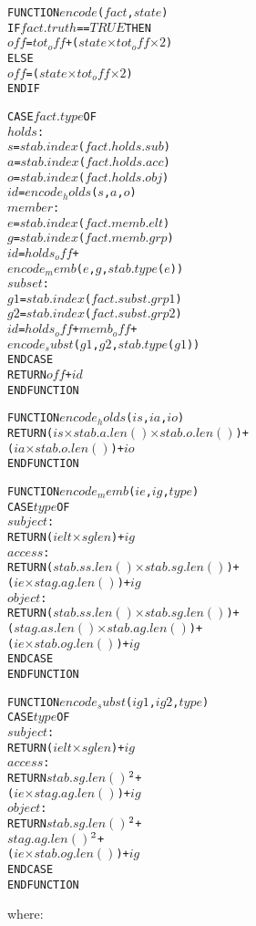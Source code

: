 \documentclass[10pt, twocolumn]{article}
\begin{document}
          \begin{alltt}
FUNCTION \(encode\)(\(fact\), \(state\))
  IF \(fact.truth\) == \(TRUE\) THEN
    \(off\) = \(tot_off\) + (\(state\) \(\times\) \(tot_off\) \(\times\) \(2\))
  ELSE
    \(off\) = (\(state\) \(\times\) \(tot_off\) \(\times\) \(2\))
  ENDIF

  CASE \(fact.type\) OF
    \(holds\) :
      \(s\) = \(stab.index\)(\(fact.holds.sub\))
      \(a\) = \(stab.index\)(\(fact.holds.acc\))
      \(o\) = \(stab.index\)(\(fact.holds.obj\))
      \(id\) = \(encode_holds\)(\(s\), \(a\), \(o\))
    \(member\) :
      \(e\) = \(stab.index\)(\(fact.memb.elt\))
      \(g\) = \(stab.index\)(\(fact.memb.grp\))
      \(id\) = \(holds_off\) +
          \(encode_memb\)(\(e\), \(g\), \(stab.type\)(\(e\)))
    \(subset\) :
      \(g1\) = \(stab.index\)(\(fact.subst.grp1\))
      \(g2\) = \(stab.index\)(\(fact.subst.grp2\))
      \(id\) = \(holds_off\) + \(memb_off\) +
          \(encode_subst\)(\(g1\), \(g2\), \(stab.type\)(\(g1\)))
  ENDCASE
  RETURN \(off\) + \(id\)
ENDFUNCTION

FUNCTION \(encode_holds\)(\(is\), \(ia\), \(io\))
  RETURN (\(is\) \(\times\) \(stab.a.len()\) \(\times\) \(stab.o.len()\)) +
         (\(ia\) \(\times\) \(stab.o.len()\)) + \(io\)
ENDFUNCTION

FUNCTION \(encode_memb\)(\(ie\), \(ig\), \(type\))
  CASE \(type\) OF
    \(subject\) :
      RETURN (\(ielt\) \(\times\) \(sglen\)) + \(ig\)
    \(access\) : 
      RETURN (\(stab.ss.len()\) \(\times\) \(stab.sg.len()\)) +
             (\(ie\) \(\times\) \(stag.ag.len()\)) + \(ig\)
    \(object\) :
      RETURN (\(stab.ss.len()\) \(\times\) \(stab.sg.len()\)) +
             (\(stag.as.len()\) \(\times\) \(stab.ag.len()\)) +
             (\(ie\) \(\times\) \(stab.og.len()\)) + \(ig\)
  ENDCASE
ENDFUNCTION

FUNCTION \(encode_subst\)(\(ig1\), \(ig2\), \(type\))
  CASE \(type\) OF
    \(subject\) :
      RETURN (\(ielt\) \(\times\) \(sglen\)) + \(ig\)
    \(access\) :
      RETURN \(stab.sg.len()\)\(\sp{2}\) +
             (\(ie\) \(\times\) \(stag.ag.len()\)) + \(ig\)
    \(object\) :
      RETURN \(stab.sg.len()\)\(\sp{2}\) +
             \(stag.ag.len()\)\(\sp{2}\) +
             (\(ie\) \(\times\) \(stab.og.len()\)) + \(ig\)
  ENDCASE
ENDFUNCTION
          \end{alltt}

          where:
\end{document}
